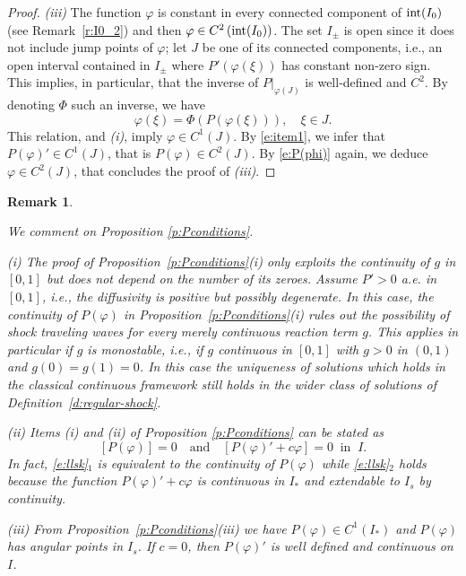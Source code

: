 \documentclass[11pt,a4paper]{article}
\newtheorem{remark}{Remark}[section]
\renewcommand{\phi}{\varphi}
\begin{document}
\begin{proof}
{\em (iii)} The function $\phi$ is constant in every connected component of ${\rm int}(I_0)$ (see Remark~\ref{r:I0_2}) and then $\phi \in C^2\left({\rm int}(I_0)\right)$. The set  $I_\pm$ is open since it does not include jump points of $\phi$; let $J $ be one of its connected components, i.e., an open interval contained in $I_{\pm}$ where $P'\left(\phi(\xi)\right)$ has constant non-zero sign. This implies, in particular, that the inverse of $P|_{\varphi(J)}$ is well-defined and $C^2$. By denoting $\Phi$ such an inverse, we have
\begin{equation}\label{e:P(phi)}
\phi(\xi)=\Phi\left(P(\phi(\xi))\right), \quad \xi \in J.
\end{equation}
This relation, and {\em (i)}, imply $\phi \in C^1(J)$. By \eqref{e:item1}, we infer that $P(\phi)' \in C^1(J)$, that is $P(\phi) \in C^2(J)$. By \eqref{e:P(phi)} again, we deduce $\phi \in C^2(J)$, that concludes the proof of {\em (iii)}.
\end{proof}

\begin{remark}\label{r:sidelimits}
{
\rm 
We comment on Proposition \ref{p:Pconditions}.

\smallskip

(i) The proof of Proposition~\ref{p:Pconditions}{\em (i)} only exploits the continuity of $g$ in $[0,1]$ but does not depend on the number  of its zeroes. Assume $P'>0$ a.e.\!\! in $[0,1]$, i.e., the diffusivity is positive but possibly degenerate. In this case, the continuity of $P(\phi)$ in Proposition~\ref{p:Pconditions}{\em (i)} rules out the possibility of shock traveling waves  for every merely continuous reaction term $g$. This applies in particular if $g$ is monostable, i.e., if $g$ continuous in $[0,1]$ with $g>0$ in $(0,1)$ and $g(0)=g(1)=0$. In this case the uniqueness of solutions which holds in the classical continuous framework \cite{GK} still holds in the wider class of solutions of Definition~\ref{d:regular-shock}.

\smallskip

(ii) Items {\em (i)} and {\em (ii)} of Proposition \ref{p:Pconditions} can be stated as 
\begin{equation}\label{e:llsk}
\left[P(\phi)\right]=0 \quad \text{and} \quad  \left[P(\phi)'+c\phi\right]=0 \ \mbox{ in } \ I.
\end{equation}
In fact, \eqref{e:llsk}$_1$ is equivalent to the continuity of $P(\phi)$ while \eqref{e:llsk}$_2$ holds because the function $P(\phi)'+c\phi$ is continuous in $I_*$ and extendable to $I_{s}$ by continuity.    

\smallskip

(iii) From Proposition~\ref{p:Pconditions}{\em (iii)} we have $P(\phi)\in C^1(I_*) $ and $P(\phi)$ has angular points in $I_{s}$. If $c=0$, then $P(\phi)'$ is well defined and continuous on $I$.    
}\end{remark}
\end{document}
